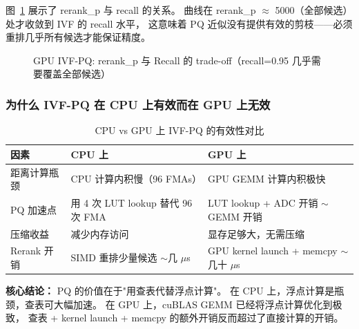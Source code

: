 \documentclass[UTF8,a4paper,10pt]{ctexart}
\begin{document}
图~\ref{fig:ivfpq-tradeoff} 展示了 rerank\_p 与 recall 的关系。
曲线在 rerank\_p $\approx$ 5000（全部候选）处才收敛到 IVF 的 recall 水平，
这意味着 PQ 近似没有提供有效的剪枝——必须重排几乎所有候选才能保证精度。

\begin{figure}[H]
\centering
{}
\caption{GPU IVF-PQ: rerank\_p 与 Recall 的 trade-off（recall=0.95 几乎需要覆盖全部候选）}
\label{fig:ivfpq-tradeoff}
\end{figure}

\subsubsection{为什么 IVF-PQ 在 CPU 上有效而在 GPU 上无效}

\begin{table}[H]
\centering
\caption{CPU vs GPU 上 IVF-PQ 的有效性对比}
\label{tab:ivfpq-cpu-gpu}
\begin{tabular}{p{2.5cm}p{3.5cm}p{3.5cm}}
\toprule
因素 & CPU 上 & GPU 上 \\
\midrule
距离计算瓶颈 & CPU 计算内积慢（96 FMAs） & GPU GEMM 计算内积极快 \\
PQ 加速点 & 用 4 次 LUT lookup 替代 96 次 FMA & LUT lookup + ADC 开销 $\sim$ GEMM 开销 \\
压缩收益 & 减少内存访问 & 显存足够大，无需压缩 \\
Rerank 开销 & SIMD 重排少量候选 $\sim$几 $\mu$s & GPU kernel launch + memcpy $\sim$几十 $\mu$s \\
\bottomrule
\end{tabular}
\end{table}

\textbf{核心结论：} PQ 的价值在于"用查表代替浮点计算"。
在 CPU 上，浮点计算是瓶颈，查表可大幅加速。
在 GPU 上，cuBLAS GEMM 已经将浮点计算优化到极致，
查表 + kernel launch + memcpy 的额外开销反而超过了直接计算的开销。
\end{document}

